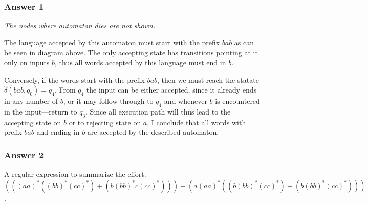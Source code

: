 \documentclass[11pt]{article}
\begin{document}
\subsubsection{Answer 1}
\label{sec:orgheadline1}

\emph{The nodes where automaton dies are not shown.}

The language accepted by this automaton must start with the prefix \(bab\) as
can be seen in diagram above.  The only accepting state has transitions
pointing at it only on inputs \(b\), thus all words accepted by this language
must end in \(b\).

Conversely, if the words start with the prefix \(bab\), then we must reach the
statate \(\hat{\delta}(bab, q_0) = q_4\).  From \(q_4\) the input can be either
accepted, since it already ends in any number of \(b\), or it may follow
through to \(q_4\) and whenever \(b\) is encountered in the input---return to
\(q_3\).  Since all execution path will thus lead to the accepting state on
\(b\) or to rejecting state on \(a\), I conclude that all words with prefix \(bab\)
and ending in \(b\) are accepted by the described automaton.

\subsubsection{Answer 2}
\label{sec:orgheadline2}
A regular expression to summarize the effort: \((((aa)^*((bb)^*(cc)^*) +
    (b(bb)^*c(cc)^*))) + (a(aa)^*((b(bb)^*(cc)^*) + (b(bb)^*(cc)^*)))\).
\end{document}
